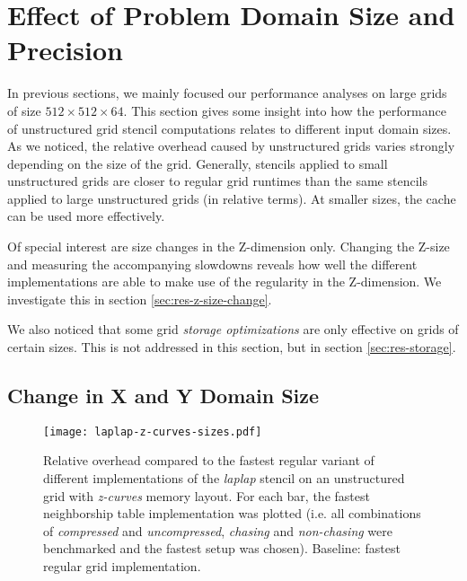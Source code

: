 \section{Effect of Problem Domain Size and Precision} \label{sec:res-size}

In previous sections, we mainly focused our performance analyses on large grids of size $512\times 512\times 64$. This section gives some insight into how the performance of unstructured grid stencil computations relates to different input domain sizes. As we noticed, the relative overhead caused by unstructured grids varies strongly depending on the size of the grid. Generally, stencils applied to small unstructured grids are closer to regular grid runtimes than the same stencils applied to large unstructured grids (in relative terms). At smaller sizes, the cache can be used more effectively.

Of special interest are size changes in the Z-dimension only. Changing the Z-size and measuring the accompanying slowdowns reveals how well the different implementations are able to make use of the regularity in the Z-dimension. We investigate this in section \ref{sec:res-z-size-change}.

We also noticed that some grid \emph{storage optimizations} are only effective on grids of certain sizes. This is not addressed in this section, but in section \ref{sec:res-storage}.

\subsection{Change in X and Y Domain Size}

\begin{figure}
	\begin{center}
    \texttt{[image: laplap-z-curves-sizes.pdf]}
	\end{center}
    \caption{\label{fig:variants-gridsizes} Relative overhead compared to the fastest regular variant of different implementations of the \emph{laplap} stencil on an unstructured grid with \emph{z-curves} memory layout. For each bar, the fastest neighborship table implementation was plotted (i.e. all combinations of \emph{compressed} and \emph{uncompressed}, \emph{chasing} and \emph{non-chasing} were benchmarked and the fastest setup was chosen). Baseline: fastest regular grid implementation.}
\end{figure}

